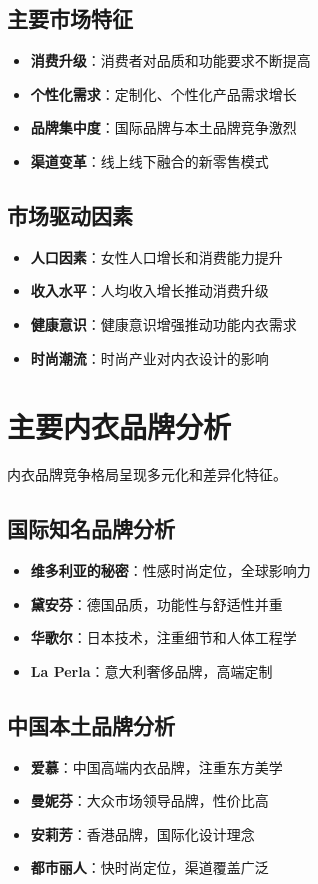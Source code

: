 \documentclass[12pt,UTF8]{ctexbook}
\begin{document}
\subsection{主要市场特征}
\begin{itemize}[leftmargin=2cm]
	\item \textbf{消费升级}：消费者对品质和功能要求不断提高
	\item \textbf{个性化需求}：定制化、个性化产品需求增长
	\item \textbf{品牌集中度}：国际品牌与本土品牌竞争激烈
	\item \textbf{渠道变革}：线上线下融合的新零售模式
\end{itemize}

\subsection{市场驱动因素}
\begin{itemize}[leftmargin=2cm]
	\item \textbf{人口因素}：女性人口增长和消费能力提升
	\item \textbf{收入水平}：人均收入增长推动消费升级
	\item \textbf{健康意识}：健康意识增强推动功能内衣需求
	\item \textbf{时尚潮流}：时尚产业对内衣设计的影响
\end{itemize}

\section{主要内衣品牌分析}
内衣品牌竞争格局呈现多元化和差异化特征。

\subsection{国际知名品牌分析}
\begin{itemize}[leftmargin=2cm]
	\item \textbf{维多利亚的秘密}：性感时尚定位，全球影响力
	\item \textbf{黛安芬}：德国品质，功能性与舒适性并重
	\item \textbf{华歌尔}：日本技术，注重细节和人体工程学
	\item \textbf{La Perla}：意大利奢侈品牌，高端定制
\end{itemize}

\subsection{中国本土品牌分析}
\begin{itemize}[leftmargin=2cm]
	\item \textbf{爱慕}：中国高端内衣品牌，注重东方美学
	\item \textbf{曼妮芬}：大众市场领导品牌，性价比高
	\item \textbf{安莉芳}：香港品牌，国际化设计理念
	\item \textbf{都市丽人}：快时尚定位，渠道覆盖广泛
\end{itemize}
\end{document}
